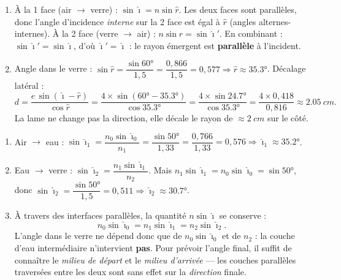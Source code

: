 \documentclass[11pt,a4paper]{article}
\begin{document}
\begin{corrige}
\begin{enumerate}[label=\alph*)]
  \item À la 1\iere{} face (air $\to$ verre) : $\sin\hat{\imath}=n\sin\hat r$. Les deux faces sont
        parallèles, donc l'angle d'incidence \emph{interne} sur la 2\ieme{} face est égal à $\hat r$
        (angles alternes-internes). À la 2\ieme{} face (verre $\to$ air) :
        $n\sin\hat r=\sin\hat{\imath}'$. En combinant : $\sin\hat{\imath}'=\sin\hat{\imath}$, d'où
        $\boxed{\hat{\imath}'=\hat{\imath}}$ : le rayon émergent est \textbf{parallèle} à l'incident.
  \item Angle dans le verre : $\sin\hat r=\dfrac{\sin\ang{60}}{1{,}5}=\dfrac{0{,}866}{1{,}5}=0{,}577
        \Rightarrow \hat r\approx\ang{35.3}$. Décalage latéral :
        \[ d=\frac{e\,\sin(\hat{\imath}-\hat r)}{\cos\hat r}
             =\frac{4\times\sin(\ang{60}-\ang{35.3})}{\cos\ang{35.3}}
             =\frac{4\times\sin\ang{24.7}}{\cos\ang{35.3}}
             =\frac{4\times0{,}418}{0{,}816}\approx\qty{2.05}{cm}. \]
        La lame ne change pas la direction, elle décale le rayon de $\approx\qty{2}{cm}$ sur le côté.
\end{enumerate}
\end{corrige}

\begin{corrige}
\begin{enumerate}[label=\alph*)]
  \item Air $\to$ eau : $\sin\hat{\imath}_1=\dfrac{n_0\sin\hat{\imath}_0}{n_1}
        =\dfrac{\sin\ang{50}}{1{,}33}=\dfrac{0{,}766}{1{,}33}=0{,}576\Rightarrow\hat{\imath}_1\approx\ang{35.2}$.
  \item Eau $\to$ verre : $\sin\hat{\imath}_2=\dfrac{n_1\sin\hat{\imath}_1}{n_2}$. Mais
        $n_1\sin\hat{\imath}_1=n_0\sin\hat{\imath}_0=\sin\ang{50}$, donc
        $\sin\hat{\imath}_2=\dfrac{\sin\ang{50}}{1{,}5}=0{,}511\Rightarrow\hat{\imath}_2\approx\ang{30.7}$.
  \item À travers des interfaces parallèles, la quantité $n\sin\hat{\imath}$ se conserve :
        \[ n_0\sin\hat{\imath}_0=n_1\sin\hat{\imath}_1=n_2\sin\hat{\imath}_2. \]
        L'angle dans le verre ne dépend donc que de $n_0\sin\hat{\imath}_0$ et de $n_2$ : la couche
        d'eau intermédiaire n'intervient \textbf{pas}. Pour prévoir l'angle final, il suffit de
        connaître le \emph{milieu de départ} et le \emph{milieu d'arrivée} — les couches parallèles
        traversées entre les deux sont sans effet sur la \emph{direction} finale.
\end{enumerate}
\end{corrige}
\end{document}
